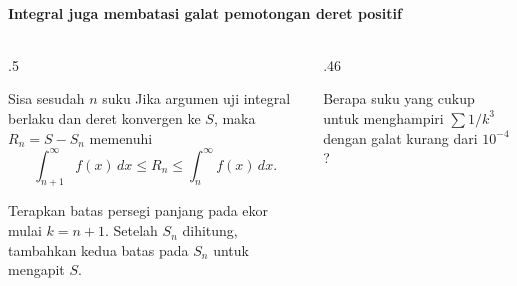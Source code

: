 \documentclass{../../kalkulus-ppt}
\begin{document}
\begin{frame}{\insertsection}
    \framesubtitle{Integral juga membatasi galat pemotongan deret positif}
    \begin{columns}[c,onlytextwidth]
        \begin{column}{.5\textwidth}
            \begin{block}{Sisa sesudah $n$ suku}
                Jika argumen uji integral berlaku dan deret
                konvergen ke $S$, maka $R_n=S-S_n$ memenuhi
                \[
                    \int_{n+1}^{\infty} f(x)\,dx
                    \le R_n\le
                    \int_n^{\infty} f(x)\,dx.
                \]
            \end{block}
            Terapkan batas persegi panjang pada ekor mulai
            $k=n+1$. Setelah $S_n$ dihitung, tambahkan
            kedua batas pada $S_n$ untuk mengapit $S$.
        \end{column}
        \begin{column}{.46\textwidth}
            \begin{contoh}
                Berapa suku yang cukup untuk menghampiri
                $\sum 1/k^3$ dengan galat kurang dari $10^{-4}$?
            \end{contoh}
        \end{column}
    \end{columns}
\end{frame}
\end{document}
